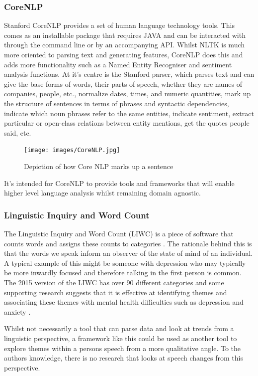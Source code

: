 \documentclass[10pt, letterpaper, twoside, openany]{book}
\begin{document}
\subsubsection{CoreNLP}
Stanford CoreNLP provides a set of human language technology tools. This comes as an installable package that requires JAVA and can be interacted with through the command line or by an accompanying API. Whilst NLTK is much more oriented to parsing text and generating features, CoreNLP does this and adds more functionality such as a Named Entity Recogniser and sentiment analysis functions. At it's centre is the Stanford parser, which parses text and can give the base forms of words, their parts of speech, whether they are names of companies, people, etc., normalize dates, times, and numeric quantities, mark up the structure of sentences in terms of phrases and syntactic dependencies, indicate which noun phrases refer to the same entities, indicate sentiment, extract particular or open-class relations between entity mentions, get the quotes people said, etc.
\par
\begin{figure}[H]
\centering
\texttt{[image: images/CoreNLP.jpg]}
\caption{Depiction of how Core NLP marks up a sentence}
\end{figure}
It's intended for CoreNLP to provide tools and frameworks that will enable higher level language analysis whilst remaining domain agnostic.

\subsubsection{Linguistic Inquiry and Word Count}
The Linguistic Inquiry and Word Count (LIWC) is a piece of software that counts words and assigns these counts to categories \cite{Pennebaker2015}. The rationale behind this is that the words we speak inform an observer of the state of mind of an individual. A typical example of this might be someone with depression who may typically be more inwardly focused and therefore talking in the first person is common\cite{Al-Mosaiwi2018}. The 2015 version of the LIWC has over 90 different categories \cite{Pennebaker2015} and some supporting research suggests that it is effective at identifying themes and associating these themes with mental health difficulties such as depression and anxiety \cite{Sonnenschein2018}. 
\par
Whilst not necessarily a tool that can parse data and look at trends from a linguistic perspective, a framework like this could be used as another tool to explore themes within a persons speech from a more qualitative angle. To the authors knowledge, there is no research that looks at speech changes from this perspective. 
\end{document}
